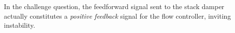 





In the challenge question, the feedforward signal sent to the stack damper actually constitutes a {\it positive feedback} signal for the flow controller, inviting instability.




